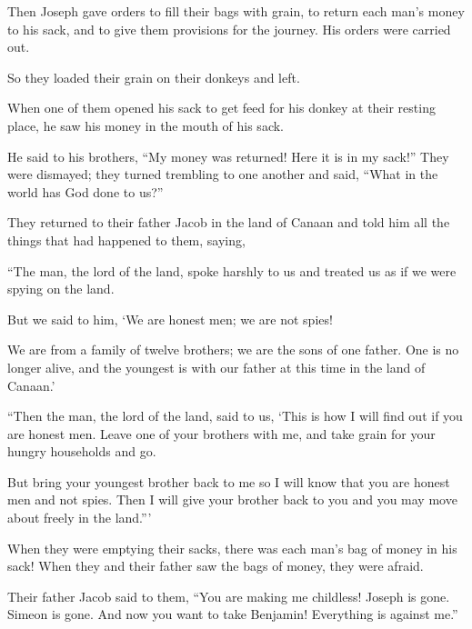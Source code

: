 \begin{scripture}
 Then Joseph gave orders to fill their bags with grain, to return each man's money to his sack, and to give them provisions for the journey. His orders were carried out.
 So they loaded their grain on their donkeys and left.
\everypar{}

 When one of them opened his sack to get feed for his donkey at their resting place, he saw his money in the mouth of his sack.
 He said to his brothers, ``My money was returned! Here it is in my sack!'' They were dismayed; they turned trembling to one another and said, ``What in the world has God done to us?''
\everypar{}

 They returned to their father Jacob in the land of Canaan and told him all the things that had happened to them, saying,
 ``The man, the lord of the land, spoke harshly to us and treated us as if we were spying on the land.
 But we said to him, `We are honest men; we are not spies!
 We are from a family of twelve brothers; we are the sons of one father. One is no longer alive, and the youngest is with our father at this time in the land of Canaan.'
\everypar{}

 ``Then the man, the lord of the land, said to us, `This is how I will find out if you are honest men. Leave one of your brothers with me, and take grain for your hungry households and go.
 But bring your youngest brother back to me so I will know that you are honest men and not spies. Then I will give your brother back to you and you may move about freely in the land.'''
\everypar{}

 When they were emptying their sacks, there was each man's bag of money in his sack! When they and their father saw the bags of money, they were afraid.
 Their father Jacob said to them, ``You are making me childless! Joseph is gone. Simeon is gone. And now you want to take Benjamin! Everything is against me.''
\everypar{}


\end{scripture}

